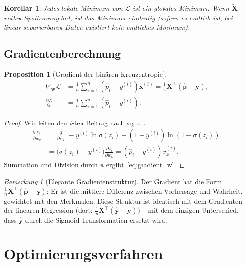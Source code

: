 ﻿\documentclass[12pt, a4paper]{article}
\newtheorem{proposition}[theorem]{Proposition}
\newtheorem{corollary}[theorem]{Korollar}
\theoremstyle{definition}
\theoremstyle{remark}
\newtheorem{remark}[theorem]{Bemerkung}
\newcommand{\sigmoid}{\sigma}
\newcommand{\vw}{\bm{w}}
\newcommand{\vx}{\bm{x}}
\newcommand{\vy}{\bm{y}}
\newcommand{\vX}{\bm{X}}
\newcommand{\vp}{\hat{\bm{p}}}
\newcommand{\T}{\top}
\begin{document}
\begin{corollary}
  Jedes lokale Minimum von $\mathcal{L}$ ist ein globales Minimum. Wenn $\tilde{\vX}$ vollen
  Spaltenrang hat, ist das Minimum eindeutig (sofern es endlich ist; bei linear separierbaren
  Daten existiert kein endliches Minimum).
\end{corollary}

\subsection{Gradientenberechnung}

\begin{proposition}[Gradient der binären Kreuzentropie]
  \begin{align}
    \nabla_{\vw} \mathcal{L} &= \frac{1}{n}\sum_{i=1}^n (\hat{p}_i - y^{(i)})\vx^{(i)}
    = \frac{1}{n}\vX^\T(\vp - \vy),
    \label{eq:gradient_w} \\
    \frac{\partial \mathcal{L}}{\partial b} &= \frac{1}{n}\sum_{i=1}^n (\hat{p}_i - y^{(i)}).
    \label{eq:gradient_b}
  \end{align}
\end{proposition}

\begin{proof}
  Wir leiten den $i$-ten Beitrag nach $w_k$ ab:
  \begin{align*}
    \frac{\partial \ell_i}{\partial w_k}
    &= \frac{\partial}{\partial w_k}\bigl[-y^{(i)}\ln\sigmoid(z_i) - (1-y^{(i)})\ln(1-\sigmoid(z_i))\bigr] \\
    &= \bigl(\sigmoid(z_i) - y^{(i)}\bigr)\frac{\partial z_i}{\partial w_k}
     = (\hat{p}_i - y^{(i)}) x_k^{(i)}.
  \end{align*}
  Summation und Division durch $n$ ergibt~\eqref{eq:gradient_w}. 
\end{proof}

\begin{remark}[Elegante Gradientenstruktur]
  Der Gradient hat die Form $\frac{1}{n}\vX^\T(\vp - \vy)$: Er ist die mittlere Differenz
  zwischen Vorhersage und Wahrheit, gewichtet mit den Merkmalen. Diese Struktur ist identisch
  mit dem Gradienten der linearen Regression (dort: $\frac{1}{n}\vX^\T(\hat{\vy}-\vy)$) --
  mit dem einzigen Unterschied, dass $\hat{\vy}$ durch die Sigmoid-Transformation ersetzt wird.
\end{remark}

\section{Optimierungsverfahren}
\end{document}
